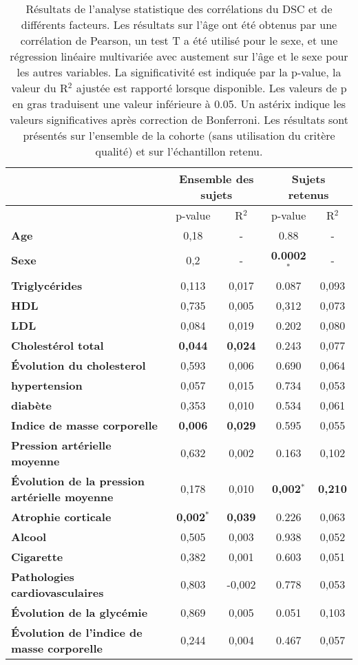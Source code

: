 \begin {table}
\caption{Résultats de l’analyse statistique des corrélations du DSC et de différents facteurs. Les résultats sur l’âge ont été
obtenus par une corrélation de Pearson, un test T a été utilisé pour le sexe, et une régression linéaire multivariée avec
austement sur l’âge et le sexe pour les autres variables. La significativité est indiquée par la p-value, la valeur du R$^2$ ajustée
est rapporté lorsque disponible. Les valeurs de p en gras traduisent une valeur inférieure à 0.05. Un astérix indique les valeurs
significatives après correction de Bonferroni. Les résultats sont présentés sur l’ensemble de la cohorte (sans utilisation du
critère qualité) et sur l’échantillon retenu.} 
\label{tab:crescendo2} 
\centering
\begin{tabularx}{\linewidth}{X | c c c c}
\hline
 & \multicolumn{2}{c}{{\bf Ensemble des sujets}} & \multicolumn{2}{c}{{\bf Sujets retenus}} \\
\hline
 & p-value & R$^2$ & p-value &  R$^2$\\
\hline
{\bf Age} & 0,18 & - & 0.88 & - \\
{\bf Sexe} & 0,2 & - & {\bf 0.0002$^{\ast}$} & - \\

{\bf Triglycérides} & 0,113 & 0,017 & 0.087 & 0,093\\ 
{\bf HDL} & 0,735 & 0,005 & 0,312& 0,073\\ 
{\bf LDL} & 0,084 & 0,019 & 0.202 & 0,080\\ 
{\bf Cholestérol total} & {\bf 0,044} & {\bf 0,024} & 0.243& 0,077\\ 
{\bf \'Evolution du cholesterol} & 0,593 & 0,006 & 0.690& 0,064\\ 
{\bf hypertension} & 0,057 & 0,015 & 0.734 & 0,053\\ 
{\bf diabète} & 0,353 & 0,010 & 0.534 & 0,061\\ 
{\bf Indice de masse corporelle} & {\bf 0,006} & {\bf 0,029} & 0.595 & 0,055\\ 
{\bf Pression artérielle moyenne} & 0,632 & 0,002 & 0.163 & 0,102\\ 
{\bf \'Evolution de la pression artérielle moyenne} & 0,178 & 0,010 & {\bf 0,002}$^{\ast}$& {\bf 0,210}\\ 
{\bf Atrophie corticale} & {\bf 0,002}$^{\ast}$ & {\bf 0,039} & 0.226 & 0,063\\ 
{\bf Alcool} & 0,505 & 0,003 & 0.938 & 0,052\\ 
{\bf Cigarette} & 0,382 & 0,001 & 0.603 & 0,051\\ 
{\bf Pathologies cardiovasculaires} & 0,803 & -0,002 & 0.778 & 0,053\\ 
{\bf \'Evolution de la glycémie} & 0,869 & 0,005 & 0.051 & 0,103\\ 
{\bf \'Evolution de l'indice de masse corporelle} & 0,244 & 0,004 & 0.467 & 0,057\\ 
\end{tabularx}

\end{table}

